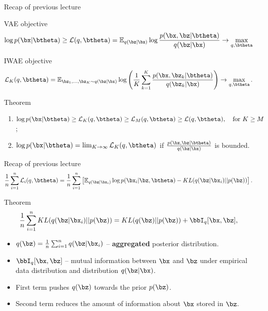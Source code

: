 \begin{frame}{Recap of previous lecture}
	\begin{block}{VAE objective}
		\vspace{-0.2cm}
		\[
		\log p(\bx | \btheta) \geq \mathcal{L} (q, \btheta)  = \mathbb{E}_{q(\bz | \bx)} \log \frac{p(\bx, \bz | \btheta)}{q(\bz| \bx)} \rightarrow \max_{q, \btheta}
		\]
		\vspace{-0.2cm}
	\end{block}
	\begin{block}{IWAE objective}
		\vspace{-0.4cm}
		\[
		\mathcal{L}_K (q, \btheta)  = \mathbb{E}_{\bz_1, \dots, \bz_K \sim q(\bz | \bx)} \log \left( \frac{1}{K}\sum_{k=1}^K\frac{p(\bx, \bz_k | \btheta)}{q(\bz_k| \bx)} \right) \rightarrow \max_{q, \btheta}.
		\]
		\vspace{-0.4cm}
	\end{block}
	\begin{block}{Theorem}
		\begin{enumerate}
			\item $\log p(\bx | \btheta) \geq \mathcal{L}_K (q, \btheta) \geq \mathcal{L}_M (q, \btheta) \geq \mathcal{L} (q, \btheta), \quad \text{for } K \geq M$;
			\item $\log p(\bx | \btheta) = \lim_{K \rightarrow \infty} \mathcal{L}_K (q, \btheta)$ if $\frac{p(\bx, \bz | \btheta)}{q(\bz | \bx)}$ is bounded.
		\end{enumerate}
	\end{block}
	
\end{frame}
\begin{frame}{Recap of previous lecture}
	\vspace{-0.3cm}
	\[
	\frac{1}{n} \sum_{i=1}^n \mathcal{L}_i(q, \btheta) = \frac{1}{n} \sum_{i=1}^n \left[ \mathbb{E}_{q(\bz | \bx_i)} \log p(\bx_i | \bz, \btheta) - KL(q(\bz | \bx_i) || p(\bz)) \right].
	\]
	\vspace{-0.3cm}
	\begin{block}{Theorem}
		\[
		\frac{1}{n} \sum_{i=1}^n KL(q(\bz | \bx_i) || p(\bz)) = KL(q(\bz) || p(\bz)) + \bbI_{q} [\bx, \bz],
		\]
		\begin{itemize}
			\item $q(\bz) = \frac{1}{n} \sum_{i=1}^n q(\bz | \bx_i)$ -- \textbf{aggregated} posterior distribution.
			\item $\bbI_{q} [\bx, \bz]$ -- mutual information between $\bx$ and $\bz$ under empirical data distribution and distribution $q(\bz | \bx)$.
			\item First term pushes $q(\bz)$ towards the prior $p(\bz)$.
			\item Second term reduces the amount of	information about $\bx$ stored in $\bz$. 
		\end{itemize}
	\end{block}
\end{frame}
